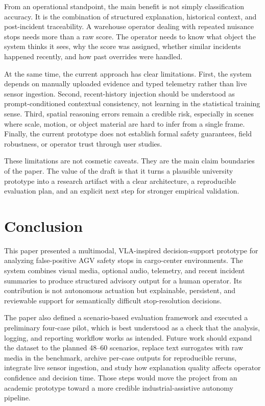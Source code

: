 \documentclass[conference]{IEEEtran}
\begin{document}
From an operational standpoint, the main benefit is not simply classification accuracy. It is the combination of structured explanation, historical context, and post-incident traceability. A warehouse operator dealing with repeated nuisance stops needs more than a raw score. The operator needs to know what object the system thinks it sees, why the score was assigned, whether similar incidents happened recently, and how past overrides were handled.

At the same time, the current approach has clear limitations. First, the system depends on manually uploaded evidence and typed telemetry rather than live sensor ingestion. Second, recent-history injection should be understood as prompt-conditioned contextual consistency, not learning in the statistical training sense. Third, spatial reasoning errors remain a credible risk, especially in scenes where scale, motion, or object material are hard to infer from a single frame. Finally, the current prototype does not establish formal safety guarantees, field robustness, or operator trust through user studies.

These limitations are not cosmetic caveats. They are the main claim boundaries of the paper. The value of the draft is that it turns a plausible university prototype into a research artifact with a clear architecture, a reproducible evaluation plan, and an explicit next step for stronger empirical validation.

\section{Conclusion}
This paper presented a multimodal, VLA-inspired decision-support prototype for analyzing false-positive AGV safety stops in cargo-center environments. The system combines visual media, optional audio, telemetry, and recent incident summaries to produce structured advisory output for a human operator. Its contribution is not autonomous actuation but explainable, persistent, and reviewable support for semantically difficult stop-resolution decisions.

The paper also defined a scenario-based evaluation framework and executed a preliminary four-case pilot, which is best understood as a check that the analysis, logging, and reporting workflow works as intended. Future work should expand the dataset to the planned 48--60 scenarios, replace text surrogates with raw media in the benchmark, archive per-case outputs for reproducible reruns, integrate live sensor ingestion, and study how explanation quality affects operator confidence and decision time. Those steps would move the project from an academic prototype toward a more credible industrial-assistive autonomy pipeline.
\end{document}

